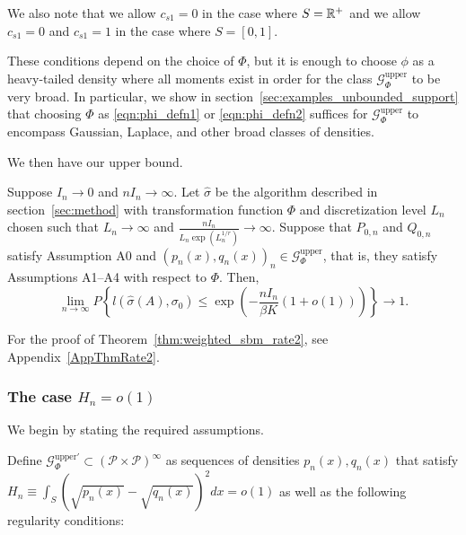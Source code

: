 \documentclass{article}
\begin{document}
We also note that we allow $c_{s1} = 0$ in the case where $S={\mathbb R}^+$ and we allow $c_{s1} = 0$ and $c_{s1}=1$ in the case where $S = [0,1]$.

These conditions depend on the choice of $\Phi$, but it is enough to choose $\phi$ as a heavy-tailed density where all moments exist in order for the class $\mathcal{G}^{\textrm{upper}}_\Phi$ to be very broad. In particular, we show in section~\ref{sec:examples_unbounded_support} that choosing $\Phi$ as \ref{eqn:phi_defn1} or \ref{eqn:phi_defn2} suffices for $\mathcal{G}^{\textrm{upper}}_\Phi$ to encompass Gaussian, Laplace, and other broad classes of densities. 

We then have our upper bound.
\begin{theorem}
  \label{thm:weighted_sbm_rate2}
Suppose $I_n \rightarrow 0$ and $n I_n \rightarrow \infty$. Let $\hat{\sigma}$ be the algorithm described in section~\ref{sec:method} with transformation function $\Phi$ and discretization level $L_n$ chosen such that $L_n \rightarrow \infty$ and $\frac{n I_n}{ L_n \exp(L_n^{1/r}) } \rightarrow \infty$. Suppose that $P_{0,n}$ and $Q_{0, n}$ satisfy Assumption A0 and $(p_n(x), q_n(x))_n \in \mathcal{G}^{\textrm{upper}}_\Phi$, that is, they satisfy Assumptions A1--A4 with respect to $\Phi$. Then,
\[
\lim_{n \rightarrow \infty} P \left\{
     l(\hat{\sigma}(A), \sigma_0) \leq \exp\left( - \frac{nI_n}{\beta K} (1 + o(1)) \right)
    \right\} \rightarrow 1.
\]
\end{theorem}
For the proof of Theorem~\ref{thm:weighted_sbm_rate2}, see Appendix~\ref{AppThmRate2}.



\subsubsection{The case $H_n = o(1)$}


We begin by stating the required assumptions.


Define $\mathcal{G}^{\textrm{upper} \prime}_\Phi \subset (\mathcal{P} \times \mathcal{P})^\infty$ as sequences of densities $p_n(x), q_n(x)$ that satisfy $H_n \equiv \int_S (\sqrt{p_n(x)} - \sqrt{q_n(x)})^2 dx = o(1)$ as well as the following regularity conditions:
\end{document}
